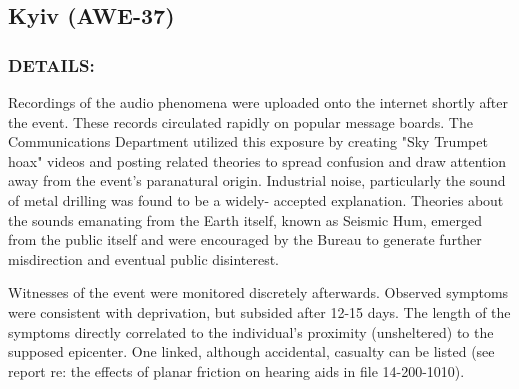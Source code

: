 \subsection*{Kyiv (AWE-37)}
\subsubsection*{DETAILS:}
\par Recordings of the audio phenomena were uploaded onto the
internet shortly after the event. These records circulated rapidly
on popular message boards. The Communications Department
utilized this exposure by creating "Sky Trumpet hoax" videos and
posting related theories to spread confusion and draw attention
away from the event's paranatural origin. Industrial noise,
particularly the sound of metal drilling was found to be a widely-
accepted explanation. Theories about the sounds emanating from
the Earth itself, known as Seismic Hum, emerged from the public
itself and were encouraged by the Bureau to generate further
misdirection and eventual public disinterest.
\par Witnesses of the event were monitored discretely afterwards.
Observed symptoms were consistent with 
deprivation, but subsided after 12-15 days. The length of the
symptoms directly correlated to the individual's proximity
(unsheltered) to the supposed epicenter. One linked, although
accidental, casualty can be listed (see report re: the effects of
planar friction on hearing aids in file 14-200-1010).